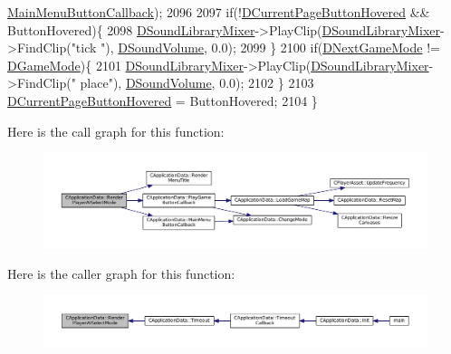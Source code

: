 \begin{DoxyCode}
      \hyperlink{classCApplicationData_a4410839118b5b74dab798ad7be6f703b}{MainMenuButtonCallback});
2096     
2097     \textcolor{keywordflow}{if}(!\hyperlink{classCApplicationData_a96b3a9b5c9965540007dff3fa85587fa}{DCurrentPageButtonHovered} && ButtonHovered)\{
2098         \hyperlink{classCApplicationData_aa1e6876121bb4fb229ec6b930a8a6766}{DSoundLibraryMixer}->PlayClip(\hyperlink{classCApplicationData_aa1e6876121bb4fb229ec6b930a8a6766}{DSoundLibraryMixer}->FindClip(\textcolor{stringliteral}{"tick
      "}), \hyperlink{classCApplicationData_aa6e540f860dcb1929ef36ddce3be3691}{DSoundVolume}, 0.0);
2099     \}
2100     \textcolor{keywordflow}{if}(\hyperlink{classCApplicationData_a3b67edeacd70201dcf96fa9fa8aa2107}{DNextGameMode} != \hyperlink{classCApplicationData_a2f906f2b4208ecb2a057e6b62e549685}{DGameMode})\{
2101         \hyperlink{classCApplicationData_aa1e6876121bb4fb229ec6b930a8a6766}{DSoundLibraryMixer}->PlayClip(\hyperlink{classCApplicationData_aa1e6876121bb4fb229ec6b930a8a6766}{DSoundLibraryMixer}->FindClip(\textcolor{stringliteral}{"
      place"}), \hyperlink{classCApplicationData_aa6e540f860dcb1929ef36ddce3be3691}{DSoundVolume}, 0.0);
2102     \}
2103     \hyperlink{classCApplicationData_a96b3a9b5c9965540007dff3fa85587fa}{DCurrentPageButtonHovered} = ButtonHovered;
2104 \}
\end{DoxyCode}
Here is the call graph for this function\+:\nopagebreak
\begin{figure}[H]
\begin{center}
\leavevmode
\includegraphics[width=350pt]{classCApplicationData_a7d46646402ac95a056456e4a3bb353ed_cgraph}
\end{center}
\end{figure}
Here is the caller graph for this function\+:\nopagebreak
\begin{figure}[H]
\begin{center}
\leavevmode
\includegraphics[width=350pt]{classCApplicationData_a7d46646402ac95a056456e4a3bb353ed_icgraph}
\end{center}
\end{figure}
\hypertarget{classCApplicationData_a18ae4aed31d9ef2416059e66babb05b0}{}\label{classCApplicationData_a18ae4aed31d9ef2416059e66babb05b0} 

